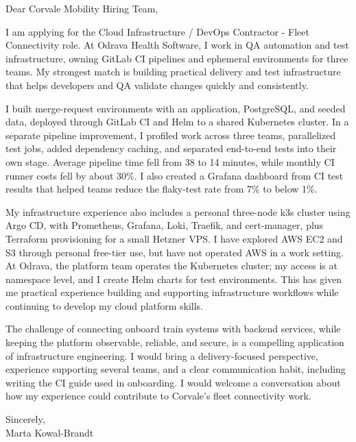\documentclass[11pt,a4paper]{article}
\begin{document}
Dear Corvale Mobility Hiring Team,

I am applying for the Cloud Infrastructure / DevOps Contractor - Fleet Connectivity role. At Odrava Health Software, I work in QA automation and test infrastructure, owning GitLab CI pipelines and ephemeral environments for three teams. My strongest match is building practical delivery and test infrastructure that helps developers and QA validate changes quickly and consistently.

I built merge-request environments with an application, PostgreSQL, and seeded data, deployed through GitLab CI and Helm to a shared Kubernetes cluster. In a separate pipeline improvement, I profiled work across three teams, parallelized test jobs, added dependency caching, and separated end-to-end tests into their own stage. Average pipeline time fell from 38 to 14 minutes, while monthly CI runner costs fell by about 30\%. I also created a Grafana dashboard from CI test results that helped teams reduce the flaky-test rate from 7\% to below 1\%.

My infrastructure experience also includes a personal three-node k3s cluster using Argo CD, with Prometheus, Grafana, Loki, Traefik, and cert-manager, plus Terraform provisioning for a small Hetzner VPS. I have explored AWS EC2 and S3 through personal free-tier use, but have not operated AWS in a work setting. At Odrava, the platform team operates the Kubernetes cluster; my access is at namespace level, and I create Helm charts for test environments. This has given me practical experience building and supporting infrastructure workflows while continuing to develop my cloud platform skills.

The challenge of connecting onboard train systems with backend services, while keeping the platform observable, reliable, and secure, is a compelling application of infrastructure engineering. I would bring a delivery-focused perspective, experience supporting several teams, and a clear communication habit, including writing the CI guide used in onboarding. I would welcome a conversation about how my experience could contribute to Corvale's fleet connectivity work.

Sincerely,\\
Marta Kowal-Brandt
\end{document}
